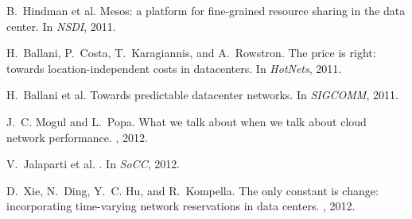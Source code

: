 \documentclass{sig-alternate-per}
\begin{document}
\vspace{-5pt}
\begin{thebibliography}{1}
\footnotesize
{B.~Hindman et al.}
\newblock Mesos: a platform for fine-grained resource sharing in the data
  center.
\newblock In {\em NSDI}, 2011.

H.~Ballani, P.~Costa, T.~Karagiannis, and A.~Rowstron.
\newblock The price is right: towards location-independent costs in
  datacenters.
\newblock In {\em HotNets}, 2011.

{H.~Ballani et al.}
\newblock Towards predictable datacenter networks.
\newblock In {\em SIGCOMM}, 2011.

J.~C. Mogul and L.~Popa.
\newblock What we talk about when we talk about cloud network performance.
, 2012.

{V.~Jalaparti et al.}
.
\newblock In {\em SoCC}, 2012.

D.~Xie, N.~Ding, Y.~C. Hu, and R.~Kompella.
\newblock The only constant is change: incorporating time-varying network
  reservations in data centers.
, 2012.
\end{thebibliography}
\end{document}
